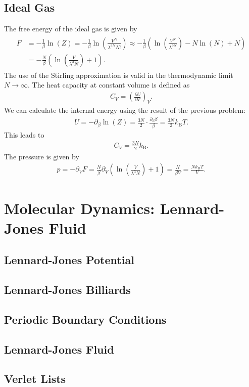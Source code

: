 \documentclass[a4paper,10pt,bibtotoc]{scrartcl}
\begin{document}
\subsection{Ideal Gas}
The free energy of the ideal gas is given by
\begin{align}
\begin{split}
 F &= -\frac{1}{\beta}\ln\left(Z\right) = -\frac{1}{\beta}\ln\left(\frac{V^N}{\lambda^{3N}N!} \right) \approx  -\frac{1}{\beta}\left(\ln\left(\frac{V^N}{\lambda^{3N}}\right) -N\ln\left(N\right) + N\right)\\
 &= -\frac{N}{\beta}\left(\ln\left(\frac{V}{\lambda^{3}N}\right) + 1\right).
\end{split}
\end{align}
The use of the Stirling approximation is valid in the thermodynamic limit $N\rightarrow \infty$.
The heat capacity at constant volume is defined as
\begin{align}
C_V = \left( \frac{\partial U}{\partial T}\right)_V.
\end{align}
We can calculate the internal energy using the result of the previous problem:
\begin{align}
 U = -\partial_\beta \ln\left(Z\right) =\frac{3N}{2}\cdot\frac{\partial_\beta \beta}{\beta} = \frac{3N}{2} k_\mathrm{B}T.
\end{align}
This leads to
\begin{align}
C_V = \frac{3N}{2} k_\mathrm{B}.
\end{align}
The pressure is given by
\begin{align}
p = -\partial_V F = \frac{N}{\beta}\partial_V\left(\ln\left(\frac{V}{\lambda^{3}N}\right) + 1\right) = \frac{N}{\beta V} = \frac{Nk_\mathrm{B}T}{V}.
\end{align}

\section{Molecular Dynamics: Lennard-Jones Fluid}
\subsection{Lennard-Jones Potential}
\subsection{Lennard-Jones Billiards}
\subsection{Periodic Boundary Conditions}
\subsection{Lennard-Jones Fluid}
\subsection{Verlet Lists}
\end{document}
